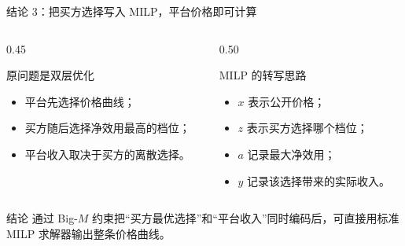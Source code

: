 \documentclass[10pt,aspectratio=169]{beamer}
\begin{document}
\begin{frame}{结论 3：把买方选择写入 MILP，平台价格即可计算}
  \begin{columns}[T,onlytextwidth]
    \begin{column}{0.45\textwidth}
      \begin{block}{原问题是双层优化}
        \begin{itemize}
          \item 平台先选择价格曲线；
          \item 买方随后选择净效用最高的档位；
          \item 平台收入取决于买方的离散选择。
        \end{itemize}
      \end{block}
    \end{column}
    \begin{column}{0.50\textwidth}
      \begin{block}{MILP 的转写思路}
        \begin{itemize}
          \item $x$ 表示公开价格；
          \item $z$ 表示买方选择哪个档位；
          \item $a$ 记录最大净效用；
          \item $y$ 记录该选择带来的实际收入。
        \end{itemize}
      \end{block}
    \end{column}
  \end{columns}
  \vspace{0.55em}
  \begin{alertblock}{结论}
    通过 Big-$M$ 约束把“买方最优选择”和“平台收入”同时编码后，可直接用标准 MILP 求解器输出整条价格曲线。
  \end{alertblock}
\end{frame}
\end{document}
